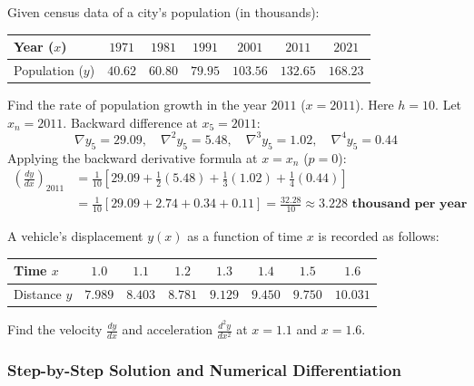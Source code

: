 \begin{examplebox}
Given census data of a city's population (in thousands):
\begin{center}
\begin{tabular}{|l|cccccc|}
\hline
Year ($x$) & $1971$ & $1981$ & $1991$ & $2001$ & $2011$ & $2021$ \\
\hline
Population ($y$) & $40.62$ & $60.80$ & $79.95$ & $103.56$ & $132.65$ & $168.23$ \\
\hline
\end{tabular}
\end{center}
Find the rate of population growth in the year $2011$ ($x = 2011$).
Here $h = 10$. Let $x_n = 2011$. Backward difference at $x_5 = 2011$:
\begin{equation}
    \nabla y_5 = 29.09, \quad \nabla^2 y_5 = 5.48, \quad \nabla^3 y_5 = 1.02, \quad \nabla^4 y_5 = 0.44
\end{equation}
Applying the backward derivative formula at $x = x_n$ ($p = 0$):
\begin{align}
    \left(\frac{dy}{dx}\right)_{2011} &= \frac{1}{10}\left[ 29.09 + \frac{1}{2}(5.48) + \frac{1}{3}(1.02) + \frac{1}{4}(0.44) \right] \nonumber \\
    &= \frac{1}{10}\left[ 29.09 + 2.74 + 0.34 + 0.11 \right] = \frac{32.28}{10} \approx \mathbf{3.228 \text{ thousand per year}}
\end{align}
\end{examplebox}

\begin{examplebox}
A vehicle's displacement $y(x)$ as a function of time $x$ is recorded as follows:
\begin{center}
\begin{tabular}{|l|ccccccc|}
\hline
Time $x$ & $1.0$ & $1.1$ & $1.2$ & $1.3$ & $1.4$ & $1.5$ & $1.6$ \\
\hline
Distance $y$ & $7.989$ & $8.403$ & $8.781$ & $9.129$ & $9.450$ & $9.750$ & $10.031$ \\
\hline
\end{tabular}
\end{center}
Find the velocity $\frac{dy}{dx}$ and acceleration $\frac{d^2 y}{dx^2}$ at $x = 1.1$ and $x = 1.6$.
\end{examplebox}

\subsubsection*{Step-by-Step Solution and Numerical Differentiation}

